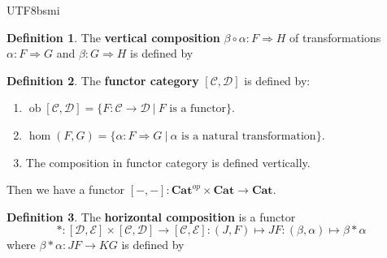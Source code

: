 \documentclass[12pt]{article}
\theoremstyle{definition}
\newtheorem{definition}{Definition}[section]
\newcommand\<{\langle}
\renewcommand\>{\rangle}
\DeclareMathOperator{\ob}{ob}
\begin{document}
\begin{CJK}{UTF8}{bsmi}
\begin{definition}
    The \textbf{vertical composition} $\beta\circ\alpha:F\Rightarrow H$ of transformations $\alpha:F\Rightarrow G$ and $\beta:G\Rightarrow H$ is defined by 
        \begin{center}
        \end{center}
\end{definition}

\begin{definition}
    The \textbf{functor category} $[\mathcal{C}, \mathcal{D}]$ is defined by:
    \begin{enumerate}
        \item $\ob[\mathcal{C}, \mathcal{D}]=\{F:\mathcal{C}\to\mathcal{D}\ |\ F\text{ is a functor}\}$.
        \item $\hom(F, G)=\{\alpha:F\Rightarrow G\ |\ \alpha\text{ is a natural transformation}\}$.
        \item The composition in functor category is defined vertically.
    \end{enumerate}
    Then we have a functor $[-, -]:\textbf{Cat}^{op}\times\textbf{Cat}\to\textbf{Cat}$.
\end{definition}

\begin{definition}
    The \textbf{horizontal composition} is a functor
    \[
        *:
        [\mathcal{D}, \mathcal{E}]\times[\mathcal{C}, \mathcal{D}] \to [\mathcal{C}, \mathcal{E}]:
        (J, F) \mapsto JF:
        (\beta, \alpha) \mapsto \beta*\alpha
    \]
    where $\beta*\alpha:JF\to KG$ is defined by
        

\end{definition}
\end{CJK}
\end{document}
